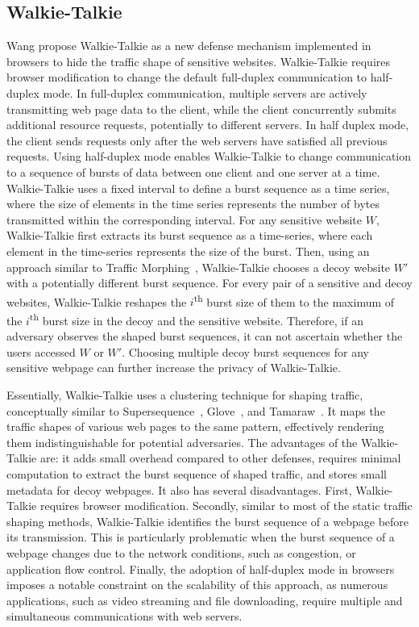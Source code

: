 \subsection{Walkie-Talkie}\label{subsubsec:walkie-talkie}
Wang propose {Walkie-Talkie} as a new defense mechanism implemented in browsers to hide the traffic shape of sensitive websites.
{Walkie-Talkie} requires browser modification to change the default full-duplex communication to half-duplex mode.
In full-duplex communication, multiple servers are actively transmitting web page data to the client, while the client concurrently submits additional resource requests, potentially to different servers.
In half duplex mode, the client sends requests only after the web servers have satisfied all previous requests.
Using half-duplex mode enables {Walkie-Talkie} to change communication to a sequence of bursts of data between one client and one server at a time.
Walkie-Talkie uses a fixed interval to define a burst sequence as a time series, where the size of elements in the time series represents the number of bytes transmitted within the corresponding interval.
For any sensitive website $W$, {Walkie-Talkie} first extracts its burst sequence as a time-series, where each element in the time-series represents the size of the burst.  
Then, using an approach similar to Traffic Morphing~\cite{wright2009traffic}, {Walkie-Talkie} chooses a decoy website $W'$ with a potentially different burst sequence.
For every pair of a sensitive and decoy websites, Walkie-Talkie reshapes the $i$\textsuperscript{th} burst size of them to the maximum of the $i$\textsuperscript{th} burst size in the decoy and the sensitive website. 
Therefore, if an adversary observes the shaped burst sequences, it can not ascertain whether the users accessed $W$ or $W'$.  
Choosing multiple decoy burst sequences for any sensitive webpage can further increase the privacy of {Walkie-Talkie}.

Essentially, {Walkie-Talkie} uses a clustering technique for shaping traffic, conceptually similar to Supersequence~\cite{wang2014supersequence}, Glove~\cite{nithyanand2014glove}, and Tamaraw~\cite{cai2014systematic}.
It maps the traffic shapes of various web pages to the same pattern, effectively rendering them indistinguishable for potential adversaries.
The advantages of the {Walkie-Talkie} are: it adds small overhead compared to other defenses, requires minimal computation to extract the burst sequence of shaped traffic, and stores small metadata for decoy webpages.
It also has several disadvantages. 
First, {Walkie-Talkie} requires browser modification.  
Secondly, similar to most of the static traffic shaping methods, {Walkie-Talkie} identifies the burst sequence of a webpage before its transmission. 
This is particularly problematic when the burst sequence of a webpage changes due to the network conditions, such as congestion, or application flow control.  
Finally, the adoption of half-duplex mode in browsers imposes a notable constraint on the scalability of this approach, as numerous applications, such as video streaming and file downloading, require multiple and simultaneous communications with web servers.


